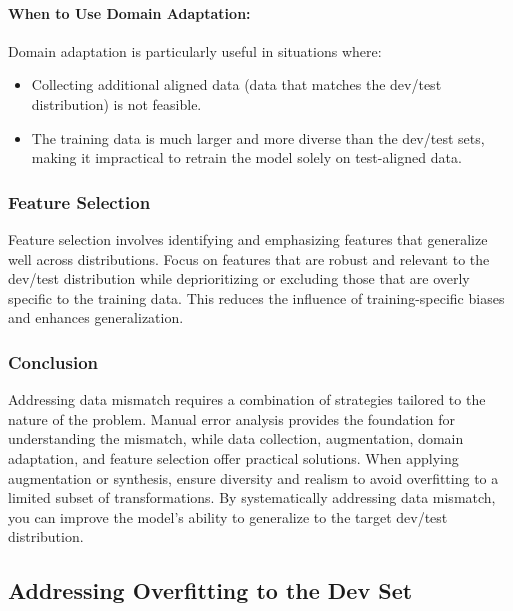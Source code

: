 \documentclass[12pt,openany, draft]{book}
\begin{document}
\paragraph{When to Use Domain Adaptation:}

Domain adaptation is particularly useful in situations where:
\begin{itemize}
    \item Collecting additional aligned data (data that matches the dev/test distribution) is not feasible.
    \item The training data is much larger and more diverse than the dev/test sets, making it impractical to retrain the model solely on test-aligned data.
\end{itemize}


\subsubsection{Feature Selection}

Feature selection involves identifying and emphasizing features that generalize well across distributions. Focus on features that are robust and relevant to the dev/test distribution while deprioritizing or excluding those that are overly specific to the training data. This reduces the influence of training-specific biases and enhances generalization.

\subsubsection{Conclusion}

Addressing data mismatch requires a combination of strategies tailored to the nature of the problem. Manual error analysis provides the foundation for understanding the mismatch, while data collection, augmentation, domain adaptation, and feature selection offer practical solutions. When applying augmentation or synthesis, ensure diversity and realism to avoid overfitting to a limited subset of transformations. By systematically addressing data mismatch, you can improve the model’s ability to generalize to the target dev/test distribution.

\subsection{Addressing Overfitting to the Dev Set}
\end{document}
